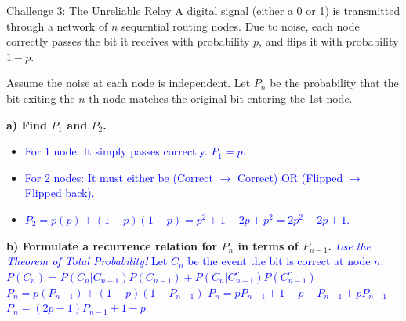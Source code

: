 \documentclass[aspectratio=169]{beamer}
\begin{document}
\begin{frame}{Challenge 3: The Unreliable Relay}
    \small
    A digital signal (either a 0 or 1) is transmitted through a network of $n$ sequential routing nodes. Due to noise, each node correctly passes the bit it receives with probability $p$, and flips it with probability $1-p$. 
    
    Assume the noise at each node is independent. Let $P_n$ be the probability that the bit exiting the $n$-th node matches the original bit entering the 1st node.
    
    \vspace{0.2cm}
    \textbf{a) Find $P_1$ and $P_2$.} \pause
    \begin{itemize}
        \item \textcolor{blue}{For 1 node: It simply passes correctly. $P_1 = p$.}
        \item \textcolor{blue}{For 2 nodes: It must either be (Correct $\rightarrow$ Correct) OR (Flipped $\rightarrow$ Flipped back).}
        \item \textcolor{blue}{$P_2 = p(p) + (1-p)(1-p) = p^2 + 1 - 2p + p^2 = 2p^2 - 2p + 1$.}
    \end{itemize} \pause
    
    \vspace{0.2cm}
    \textbf{b) Formulate a recurrence relation for $P_n$ in terms of $P_{n-1}$.} \pause
    \newline \textcolor{blue}{\textit{Use the Theorem of Total Probability!} Let $C_n$ be the event the bit is correct at node $n$.}
    \newline \textcolor{blue}{$P(C_n) = P(C_n | C_{n-1})P(C_{n-1}) + P(C_n | C_{n-1}^c)P(C_{n-1}^c)$}
    \newline \textcolor{blue}{$P_n = p(P_{n-1}) + (1-p)(1 - P_{n-1})$}
    \newline \textcolor{blue}{$P_n = pP_{n-1} + 1 - p - P_{n-1} + pP_{n-1}$}
    \newline \textcolor{blue}{$P_n = (2p - 1)P_{n-1} + 1 - p$}
\end{frame}
\end{document}
